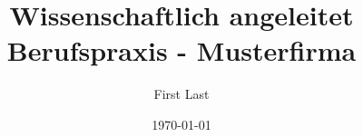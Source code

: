 %
%

\newcommand{\fullname}{First Last}
\newcommand{\email}{first.last@stud-provadis-hochschule.de}
\newcommand{\matnr}{XXXX}
\newcommand{\telMobil}{+49 XXX XXXXXXX}
\newcommand{\fakultaet}{Informatik und Wirtschaftsinformatik}

\newcommand{\titel}{Textvorlage für wissenschaftliche Arbeiten\\
Titel und Untertitel der Arbeit}
\newcommand{\unternehmen}{Musterfirma}

\newcommand{\abgabedatum}{XX.XX.XXXX}

\newcommand{\refFirst}{Prof. Dr. First Last}
\newcommand{\refSecond}{Prof. Dr. First Last}

\title{Wissenschaftlich angeleitet Berufspraxis - \unternehmen}
\author{\fullname}
\date{\today}